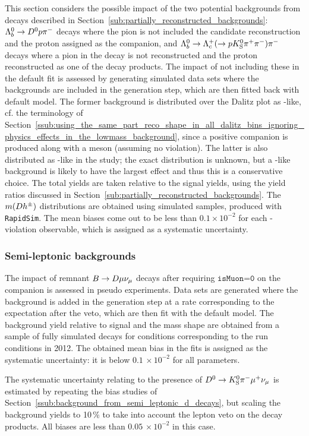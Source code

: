 This section considers the possible impact of the two potential backgrounds from \Lb decays described in Section~\ref{sub:partially_reconstructed_backgrounds}: ${{\Lambda}^0_{b}}\rightarrow{\ensuremath{{D}^0}} p{{\pi}^-}$  decays where the pion is not included the candidate reconstruction and the proton assigned as the companion, and ${{\Lambda}^0_{b}}\rightarrow{\ensuremath{{\Lambda}^+_{c}}}(\rightarrow p{{K}^0_{\mathrm{S}}} {{\pi}^+}{{\pi}^-}){{\pi}^-}$ decays  where a pion in the \Lc decay is not reconstructed and the proton reconstructed as one of the \D decay products. The impact of not including these in the default fit is assessed by generating simulated data sets where the backgrounds are included in the generation step, which are then fitted back with default model. The former background is distributed over the Dalitz plot as \Dzb-like, cf. the terminology of Section~\ref{ssub:using_the_same_part_reco_shape_in_all_dalitz_bins_ignoring_physics_effects_in_the_lowmass_background}, since a positive companion is produced along with a \Dz meson (assuming no \CP violation). The latter is also distributed as \Dzb-like in the study; the exact distribution is unknown, but a \Dzb-like background is likely to have the largest effect and thus this is a conservative choice. The total yields are taken relative to the signal yields, using the yield ratios discussed in Section~\ref{sub:partially_reconstructed_backgrounds}.
The $m({D} h^\pm)$ distributions are obtained using simulated samples, produced with \texttt{RapidSim}. The mean biases come out to be less than $0.1\times 10^{-2}$ for each \CP-violation observable, which is assigned as a systematic uncertainty.

\subsubsection{Semi-leptonic backgrounds} %
\label{ssub:semi_leptonic_backgrounds_systematic}

The impact of remnant ${B}\rightarrow{\ensuremath{D}} \mu \nu_\mu$ decays after requiring $\texttt{isMuon=0}$ on the companion is assessed in pseudo experiments. Data sets are generated where the background is added in the generation step at a rate corresponding to the expectation after the veto, which are then fit with the default model. The background yield relative to  signal and the mass shape are obtained from a sample of fully simulated decays for conditions corresponding to the run conditions in 2012. The obtained mean bias in the fits is assigned as the systematic uncertainty: it is below $0.1\,\times10^{-2}$ for all parameters.

The systematic uncertainty relating to the presence of ${{D}^0}\rightarrow{\ensuremath{{K}^0_{\mathrm{S}}}}{\ensuremath{{\pi}^-}}\mu^+\nu_\mu$ is estimated by repeating the bias studies of Section~\ref{ssub:background_from_semi_leptonic_d_decays}, but scaling the background yields to 10\,\% to take into account the lepton veto on the \D decay products. All biases are less than $0.05\,\times 10^{-2}$ in this case.


